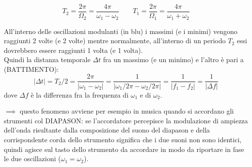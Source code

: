 \documentclass{article}
\begin{document}
\vspace{0.5cm}
\begin{equation*}
T_2 = \frac{2\pi}{\Omega_2} = \frac{4\pi}{\omega_1 - \omega_2} \qquad T_1 = \frac{2\pi}{\Omega_1} = \frac{4\pi}{\omega_1 + \omega_2}
\end{equation*}

All'interno delle oscillazioni modulanti (in blu) i massimi (e i minimi) vengono raggiunti 2 volte (e 2 volte) mentre normalmente, all'interno di un periodo $T_2$ essi dovrebbero essere raggiunti 1 volta (e 1 volta).\\
Quindi la distanza temporale $\Delta t$ fra un massimo (e un minimo) e l'altro è pari a (BATTIMENTO):
\begin{equation*}
|\Delta t| = T_2 / 2 = \frac{2\pi}{|\omega_1 - \omega_2|} = \frac{1}{|\omega_1 / 2\pi - \omega_2 / 2\pi|} = \frac{1}{|f_1 - f_2|} = \frac{1}{|\Delta f|}
\end{equation*}
dove $\Delta f$ è la differenza fra la frequenza di $\omega_1$ e di $\omega_2$.

$\implies$ questo fenomeno avviene per esempio in musica quando si accordano gli strumenti col DIAPASON: se l'accordatore percepisce la modulazione di ampiezza dell'onda risultante dalla composizione del suono del diapason e della corrispondente corda dello strumento significa che i due suoni non sono identici, quindi agisce sul tasto dello strumento da accordare in modo da riportare in fase le due oscillazioni ($\omega_1 = \omega_2$).
\end{document}
